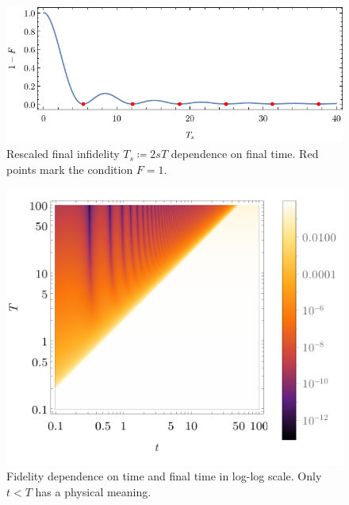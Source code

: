 \begin{figure}[h]
    \centering
    \includegraphics[scale=1.2]{../img/fidelityZeros.pdf}
    \caption{Rescaled final infidelity $T_s\coloneqq 2s T$ dependence on final time. Red points mark the condition $F=1$.}
    \label{fig:fidelityZeros}
\end{figure}


\begin{figure}[h]
    \centering
    \includegraphics[scale=1.2]{../img/dens3.pdf}
    \caption{Fidelity dependence on time and final time in log-log scale. Only $t<T$ has a physical meaning.}
    \label{fig:dens3}
\end{figure}


